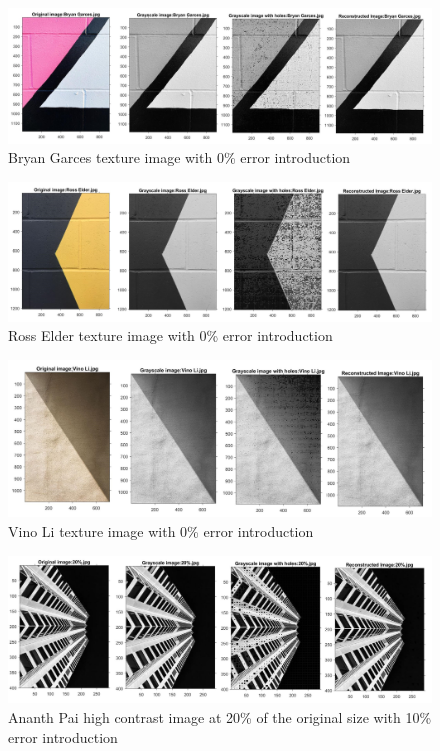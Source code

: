 \begin{figure}[!ht]
\center \includegraphics[scale=0.28]{BryanGarces.jpg}
\caption{Bryan Garces texture image with 0\% error introduction}
\label{fig:bgt}
\end{figure}

\begin{figure}[!ht]
\center \includegraphics[scale=0.28]{RossElder.jpg}
\caption{Ross Elder texture image with 0\% error introduction}
\label{fig:ret}
\end{figure}

\begin{figure}[!ht]
\center \includegraphics[scale=0.32]{VinoLi.jpg}
\caption{Vino Li texture image with 0\% error introduction}
\label{fig:vlt}
\end{figure}



\begin{figure}[!ht]
\center \includegraphics[scale=0.3]{AnanthPai20.jpg}
\caption{Ananth Pai high contrast image at 20\% of the original size with 10\% error introduction}
\label{fig:AnanthPai20}
\end{figure}

